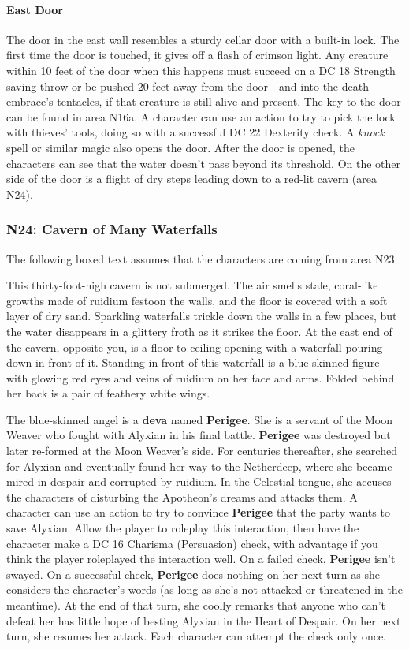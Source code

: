 \documentclass[10pt,a4,twoside,twocolumn,openany,nodeprecatedcode]{dndbook}
\begin{document}
\paragraph{East Door}
The door in the east wall resembles a sturdy cellar door with a built-in lock. The first time the door is touched, it gives off a flash of crimson light. Any creature within 10 feet of the door when this happens must succeed on a DC 18 Strength saving throw or be pushed 20 feet away from the door—and into the death embrace's tentacles, if that creature is still alive and present.
The key to the door can be found in area N16a. A character can use an action to try to pick the lock with thieves' tools, doing so with a successful DC 22 Dexterity check. A \textit{knock} spell or similar magic also opens the door.
After the door is opened, the characters can see that the water doesn't pass beyond its threshold. On the other side of the door is a flight of dry steps leading down to a red-lit cavern (area N24).
\subsubsection{N24: Cavern of Many Waterfalls}
The following boxed text assumes that the characters are coming from area N23:
\begin{DndReadAloud}{}
This thirty-foot-high cavern is not submerged. The air smells stale, coral-like growths made of ruidium festoon the walls, and the floor is covered with a soft layer of dry sand. Sparkling waterfalls trickle down the walls in a few places, but the water disappears in a glittery froth as it strikes the floor.
At the east end of the cavern, opposite you, is a floor-to-ceiling opening with a waterfall pouring down in front of it. Standing in front of this waterfall is a blue-skinned figure with glowing red eyes and veins of ruidium on her face and arms. Folded behind her back is a pair of feathery white wings.
\end{DndReadAloud}

The blue-skinned angel is a \textbf{deva} named \textbf{Perigee}. She is a servant of the Moon Weaver who fought with Alyxian in his final battle. \textbf{Perigee} was destroyed but later re-formed at the Moon Weaver's side. For centuries thereafter, she searched for Alyxian and eventually found her way to the Netherdeep, where she became mired in despair and corrupted by ruidium. In the Celestial tongue, she accuses the characters of disturbing the Apotheon's dreams and attacks them.
A character can use an action to try to convince \textbf{Perigee} that the party wants to save Alyxian. Allow the player to roleplay this interaction, then have the character make a DC 16 Charisma (Persuasion) check, with advantage if you think the player roleplayed the interaction well. On a failed check, \textbf{Perigee} isn't swayed. On a successful check, \textbf{Perigee} does nothing on her next turn as she considers the character's words (as long as she's not attacked or threatened in the meantime). At the end of that turn, she coolly remarks that anyone who can't defeat her has little hope of besting Alyxian in the Heart of Despair. On her next turn, she resumes her attack. Each character can attempt the check only once.
\end{document}
